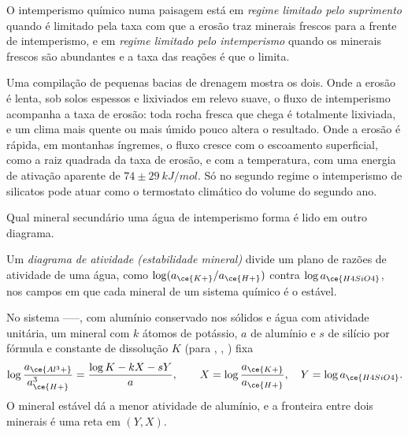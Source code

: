 \begin{definition}\label{def:b3:water-rock-interaction:regimes}
O intemperismo químico numa paisagem está em \emph{regime limitado pelo
suprimento} quando é limitado pela taxa com que a
erosão traz minerais frescos para a frente de intemperismo, e em
\emph{regime limitado pelo intemperismo} quando
os minerais frescos são abundantes e a taxa das reações é que o limita.
\end{definition}

Uma compilação de pequenas bacias de drenagem mostra os dois. Onde a erosão é lenta, sob
solos espessos e lixiviados em relevo suave, o fluxo de intemperismo acompanha a taxa de
erosão: toda rocha fresca que chega é totalmente lixiviada, e um clima mais quente ou
mais úmido pouco altera o resultado. Onde a erosão é rápida, em montanhas íngremes, o
fluxo cresce com o escoamento superficial, como a raiz quadrada da taxa de erosão, e com
a temperatura, com uma energia de ativação aparente de $74 \pm
\qty{29}{kJ/mol}$. Só no segundo regime o intemperismo de silicatos pode atuar como
o termostato climático do volume do segundo ano.

Qual mineral secundário uma água de intemperismo forma é lido em outro
diagrama.

\begin{definition}\label{def:b3:water-rock-interaction:activity-diagram}
Um \emph{diagrama de atividade (estabilidade mineral)}
divide um plano de razões de atividade de uma água, como
$\log(a_{\ce{K+}}/a_{\ce{H+}})$ contra $\log a_{\ce{H4SiO4}}$, nos
campos em que cada mineral de um sistema químico é o estável.
\end{definition}

\begin{proposition}\label{prop:b3:water-rock-interaction:boundaries}
No sistema ------, com alumínio conservado nos sólidos
e água com atividade unitária, um mineral com $k$ átomos de potássio, $a$ de alumínio e
$s$ de silício por fórmula e constante de dissolução $K$ (para ,
, ) fixa
\[
\log\frac{a_{\ce{Al^3+}}}{a_{\ce{H+}}^3} = \frac{\log K - kX - sY}{a},
\qquad X = \log\frac{a_{\ce{K+}}}{a_{\ce{H+}}},\quad Y = \log a_{\ce{H4SiO4}}.
\]
O mineral estável dá a menor atividade de alumínio, e a fronteira
entre dois minerais é uma reta em $(Y, X)$.
\end{proposition}

